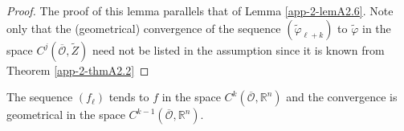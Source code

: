 \begin{proof}
The proof of this lemma parallels that of Lemma \ref{app-2-lemA2.6}. Note only that
the (geometrical) convergence of the sequence
$(\widetilde{\varphi}_{\ell + k})$ to $\widetilde{\varphi}$ in the
space $C^{j}(\overline{\mathscr{O}}, \widetilde{Z})$ need not be
listed in the assumption since it is known from Theorem \ref{app-2-thmA2.2}
\end{proof}

\begin{alphtheorem}\label{app-2-thmA2.4}%
The sequence $(f_{\ell})$ tends to $f$ in the space
$C^{k}(\overline{\mathscr{O}}, \mathbb{R}^{n})$ and the convergence is
geometrical in the space $C^{k-1} (\overline{\mathscr{O}}, \mathbb{R}^{n})$.
\end{alphtheorem}

